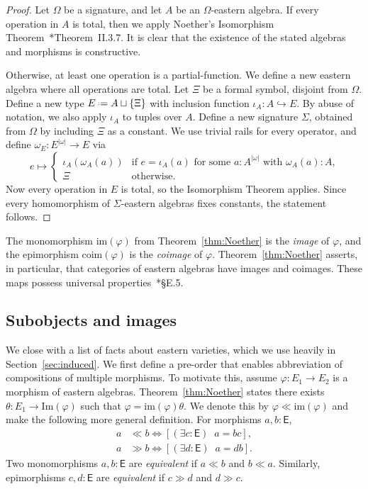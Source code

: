 \documentclass{amsart}
\newcommand{\tin}{:}
\newcommand{\acat}[1]{\mathsf{#1}}
\newcommand{\NaN}{\Xi}
\numberwithin{lstfloat}{section}
\newcommand{\defeq}{\mathrel{\hstretch{.13}{=}\hspace{.2ex}{=}}}
\theoremstyle{definition}
\theoremstyle{remark}
\numberwithin{equation}{section}
\begin{document}
\begin{proof}
  Let $\Omega$ be a signature, and let $A$ be an $\Omega$-eastern algebra. If
  every operation in $A$ is total, then we apply
Noether's Isomorphism Theorem~\cite{Cohn}*{Theorem~II.3.7}. It is clear that the existence of the stated algebras and morphisms is constructive.

  Otherwise, at least one operation is a partial-function. We define a new
  eastern algebra where all operations are total. Let $\NaN$ be a formal symbol,
  disjoint from $\Omega$. Define a new type $E \defeq A \sqcup \{\NaN\}$ with
  inclusion function $\iota_A : A \hookrightarrow E$. By abuse of notation, we also apply $\iota_A$ to tuples over $A$. Define a new signature
  $\Sigma$, obtained from $\Omega$ by including $\NaN$ as a constant. We use
  trivial rails for every operator, and define $\omega_E : E^{|\omega|} \to E$ via 
  \[ 
    e\mapsto \begin{cases}
      \iota_A(\omega_A(a)) & \text{if $e=\iota_A(a)$ for some $a: A^{|\omega|}$ with $\omega_A(a):A$,} \\
      \NaN  & \text{otherwise}.
    \end{cases}
  \] 
  Now every operation in $E$ is total, so the Isomorphism Theorem applies.
  Since every homomorphism of $\Sigma$-eastern algebras fixes constants, the
  statement follows. 
\end{proof}

The monomorphism $\mathrm{im}(\varphi)$ from Theorem~\ref{thm:Noether} is the
\emph{image} of $\varphi$, and the epimorphism $\mathrm{coim}(\varphi)$ is the
\emph{coimage} of $\varphi$. 
Theorem~\ref{thm:Noether} asserts, in particular, that categories of eastern 
algebras have images and coimages.
These maps possess universal properties~\cite{Riehl}*{\S E.5}.

\subsection{Subobjects and images}
\label{sec:subobjects-images}

We close with a list of facts about eastern varieties, which we use heavily in Section~\ref{sec:induced}. We first define a pre-order that enables abbreviation of compositions of multiple morphisms. To motivate this, assume $\varphi : E_1\to E_2$ is a morphism of eastern
algebras. Theorem~\ref{thm:Noether} states there exists $\theta : E_1 \to
\mathrm{Im}(\varphi)$ such that $\varphi = \mathrm{im}(\varphi) \theta$. We
denote this by $\varphi\ll \mathrm{im}(\varphi)$ and make the following more
general definition. For morphisms $a,b\tin \acat{E}$, 
\begin{align}
  \label{eq:pre-order}
  a &\ll b \iff  \left[(\exists c:\acat{E})\;\; 
  a=bc\right], \\
  \label{eq:dual-ll}
  a &\gg b \iff  \left[(\exists d:\acat{E})\;\; 
  a=db\right].
\end{align}
Two monomorphisms $a,b:\acat{E}$ are \emph{equivalent} if $a\ll b$ and
$b\ll a$. Similarly, epimorphisms $c,d:\acat{E}$ are \emph{equivalent} if $c\gg
d$ and $d\gg c$.
\end{document}
